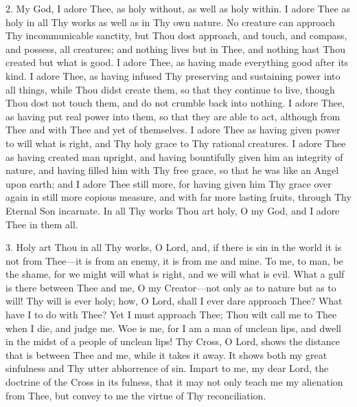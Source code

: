2. My God, I adore Thee, as holy
without, as well as holy within. I adore Thee as holy in all Thy works
as well as in Thy own nature. No creature can approach Thy
incommunicable sanctity, but Thou dost approach, and touch, and compass,
and possess, all creatures; and nothing lives but in Thee, and
nothing hast Thou created but what is good. I adore Thee, as having made
everything good after its kind. I adore Thee, as having infused Thy
preserving and sustaining power into all things, while Thou didst create
them, so that they continue to live, though Thou dost not touch them,
and do not crumble back into nothing. I adore Thee, as having put real
power into them, so that they are able to act, although from Thee and
with Thee and yet of themselves. I adore Thee as having given power to
will what is right, and Thy holy grace to Thy rational creatures. I
adore Thee as having created man upright, and having bountifully given
him an integrity of nature, and having filled him with Thy free grace,
so that he was like an Angel upon earth; and I adore Thee still more,
for having given him Thy grace over again in still more copious measure,
and with far more lasting fruits, through Thy Eternal Son incarnate. In
all Thy works Thou art holy, O my God, and I adore Thee in them all.

3. Holy art Thou in all Thy
works, O Lord, and, if there is sin in the world it is not from
Thee—it is from an enemy, it is from me and mine. To me, to man, be
the shame, for we might will what is right, and we will what is evil.
What a gulf is there between Thee and me, O my Creator—not only as to
nature but as to will! Thy will is ever holy; how, O Lord, shall I ever
dare approach Thee? What have I to do with Thee? Yet I must approach
Thee; Thou wilt call me to Thee when I die, and judge me. Woe is me, for
I am a man of unclean lips, and dwell in the midst of a people of
unclean lips! Thy Cross, O Lord, shows the distance that is between Thee
and me, while it takes it away. It shows both my great sinfulness and
Thy utter abhorrence of sin. Impart to me, my dear Lord, the doctrine of
the Cross in its fulness, that it may not only teach me my alienation
from Thee, but convey to me the virtue of Thy reconciliation.



